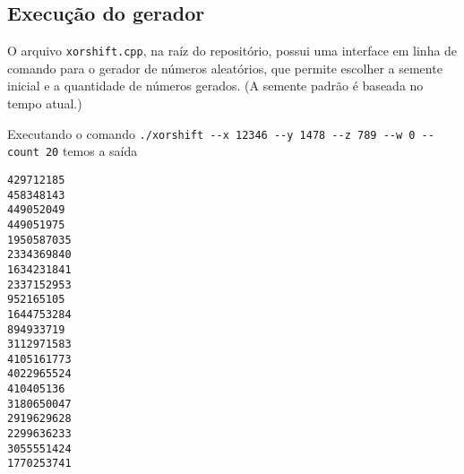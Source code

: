 \documentclass{article}
\begin{document}
\subsection{Execução do gerador}

O arquivo \verb"xorshift.cpp", na raíz do repositório,
possui uma interface em linha de comando para o gerador de números aleatórios,
que permite escolher a semente inicial e a quantidade de números gerados.
(A semente padrão é baseada no tempo atual.)

Executando o comando \verb"./xorshift --x 12346 --y 1478 --z 789 --w 0 --count 20"
temos a saída
\begin{verbatim}
429712185
458348143
449052049
449051975
1950587035
2334369840
1634231841
2337152953
952165105
1644753284
894933719
3112971583
4105161773
4022965524
410405136
3180650047
2919629628
2299636233
3055551424
1770253741
\end{verbatim}
\end{document}
